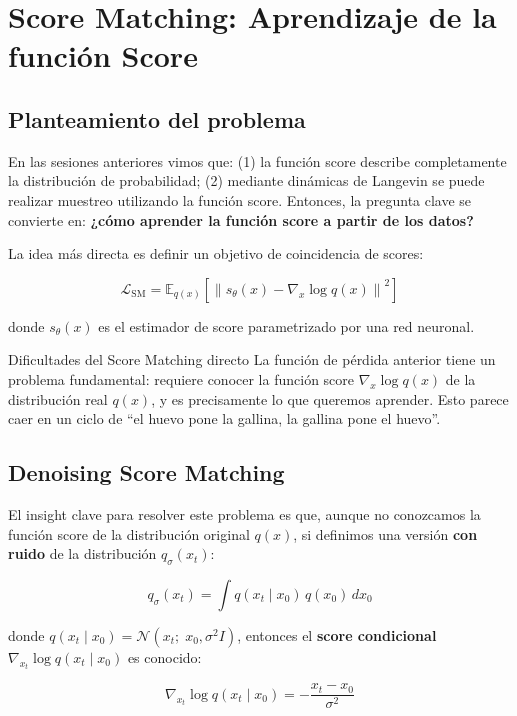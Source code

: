 \section{Score Matching: Aprendizaje de la función Score}

\subsection{Planteamiento del problema}

En las sesiones anteriores vimos que: (1) la función score describe completamente la distribución de probabilidad; (2) mediante dinámicas de Langevin se puede realizar muestreo utilizando la función score. Entonces, la pregunta clave se convierte en: \textbf{¿cómo aprender la función score a partir de los datos?}

La idea más directa es definir un objetivo de coincidencia de scores:

$$\mathcal{L}_{\text{SM}} = \mathbb{E}_{q(x)}\left[\left\| s_\theta(x) - \nabla_x \log q(x) \right\|^2\right]$$

donde $s_\theta(x)$ es el estimador de score parametrizado por una red neuronal.

\begin{warningbox}{Dificultades del Score Matching directo}
La función de pérdida anterior tiene un problema fundamental: requiere conocer la función score $\nabla_x \log q(x)$ de la distribución real $q(x)$, y es precisamente lo que queremos aprender. Esto parece caer en un ciclo de ``el huevo pone la gallina, la gallina pone el huevo''.
\end{warningbox}

\subsection{Denoising Score Matching}

El insight clave para resolver este problema es que, aunque no conozcamos la función score de la distribución original $q(x)$, si definimos una versión \textbf{con ruido} de la distribución $q_\sigma(x_t)$:

$$q_\sigma(x_t) = \int q(x_t \mid x_0)\, q(x_0)\, dx_0$$

donde $q(x_t \mid x_0) = \mathcal{N}(x_t;\; x_0, \sigma^2 I)$, entonces el \textbf{score condicional} $\nabla_{x_t} \log q(x_t \mid x_0)$ es conocido:

$$\nabla_{x_t} \log q(x_t \mid x_0) = -\frac{x_t - x_0}{\sigma^2}$$

